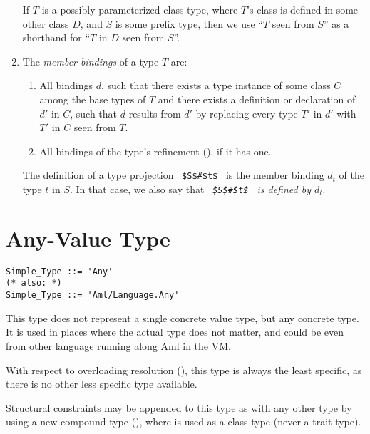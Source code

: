 \begin{enumerate}
If $T$ is a possibly parameterized class type, where $T$'s class is defined in some other class $D$, and $S$ is some prefix type, then we use ``$T$ seen from $S$'' as a shorthand for ``$T$ in $D$ seen from $S$''. 

\item
The {\em member bindings} of a type $T$ are:
\begin{enumerate}
\item All bindings $d$, such that there exists a type instance of some class $C$ among the base types of $T$ and there exists a definition or declaration of $d'$ in $C$, such that $d$ results from $d'$ by replacing every type $T'$ in $d'$ with $T'$ in $C$ seen from $T$.
\item All bindings of the type's refinement (), if it has one. 
\end{enumerate}

The definition of a type projection ~\lstinline!$S$#$t$!~ is the member binding $d_t$ of the type $t$ in $S$. In that case, we also say that {\em ~\lstinline!$S$#$t$!~ is defined by $d_t$}. 

\end{enumerate}







\section{Any-Value Type}
\label{sec:any-value-type}

\grammar\begin{lstlisting}[morekeywords={Any},deletekeywords={also}]
Simple_Type ::= 'Any'
(* also: *)
Simple_Type ::= 'Aml/Language.Any'
\end{lstlisting}

This type does not represent a single concrete value type, but any concrete type. It is used in places where the actual type does not matter, and could be even from other language running along Aml in the VM. 

With respect to overloading resolution (), this type is always the least specific, as there is no other less specific type available. 

Structural constraints may be appended to this type as with any other type by using a new compound type (), where  is used as a class type (never a trait type).

